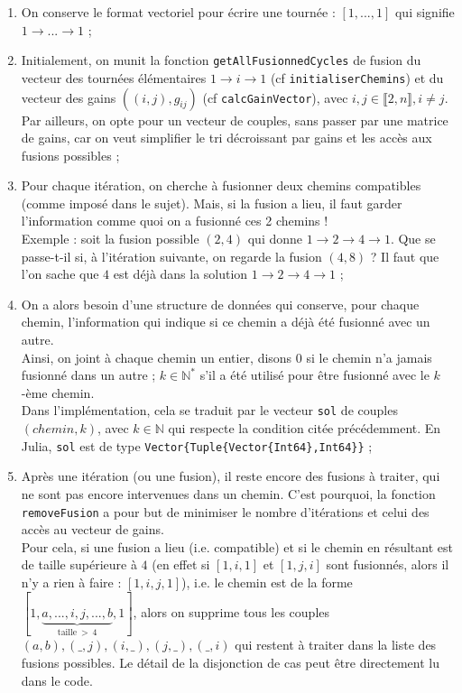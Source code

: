 \documentclass[french, 11pt, a4paper]{article} %
\newcommand{\N}{\mathbb{N}}
\newcommand{\ra}{\rightarrow}
\begin{document}
\begin{enumerate}
    \item On conserve le format vectoriel pour écrire une tournée : $[1,...,1]$ qui signifie $1 \ra ... \ra 1$ ;
    \item Initialement, on munit la fonction \verb+getAllFusionnedCycles+ de fusion du vecteur des tournées élémentaires $1 \ra i \ra 1$ 
    (cf \verb+initialiserChemins+)
    et du vecteur des gains $((i,j),g_{ij})$ (cf \verb+calcGainVector+), avec $i,j \in \llbracket 2,n \rrbracket, i \neq j$.
    Par ailleurs, on opte pour un vecteur de couples, sans passer par une matrice de gains, car on veut simplifier le tri décroissant par gains et les accès aux fusions
    possibles ;
    \item Pour chaque itération, on cherche à fusionner deux chemins compatibles (comme imposé dans le sujet). 
        Mais, si la fusion a lieu, il faut garder l'information comme quoi on a fusionné ces 2 chemins !
        \\ Exemple : soit la fusion possible $(2,4)$ qui donne $1 \ra 2 \ra 4 \ra 1$. 
        Que se passe-t-il si, à l'itération suivante, on regarde la fusion $(4,8)$ ? 
        Il faut que l'on sache que $4$ est déjà dans la solution $1 \ra 2 \ra 4 \ra 1$ ;
    \item On a alors besoin d'une structure de données qui conserve, pour chaque chemin, 
    l'information qui indique si ce chemin a déjà été fusionné avec un autre. 
    \\ Ainsi, on joint à chaque chemin un entier,
    disons $0$ si le chemin n'a jamais fusionné dans un autre ; $k \in \N^*$ s'il a été utilisé pour être fusionné avec le $k$-ème chemin.
    \\ Dans l'implémentation, cela se traduit par le vecteur \verb+sol+ de couples $(chemin,k)$, 
    avec $k \in \N$ qui respecte la condition citée précédemment. En Julia, \verb+sol+ est de type \texttt{Vector\{Tuple\{Vector\{Int64\},Int64\}\}} ;
    \item Après une itération (ou une fusion), il reste encore des fusions à traiter, qui ne sont pas encore intervenues dans un chemin. 
    C'est pourquoi, la fonction \verb+removeFusion+ a pour but de minimiser le nombre d'itérations 
    et celui des accès au vecteur de gains.
    \\ Pour cela, si une fusion a lieu (i.e. compatible) et si le chemin en résultant est de taille supérieure à $4$ 
    (en effet si $[1,i,1]$ et $[1,j,i]$ sont fusionnés, alors il n'y a rien à faire : $[1,i,j,1]$), 
    i.e. le chemin est de la forme $[1,\underbrace{a,...,i,j,...,b}_{\text{taille} ~>~ 4},1]$, alors on supprime tous les couples 
    $(a,b), (\_,j), (i,\_), (j,\_), (\_,i)$ qui restent à traiter dans la liste des fusions possibles. Le détail de la disjonction de cas
    peut être directement lu dans le code.
\end{enumerate}
\end{document}
